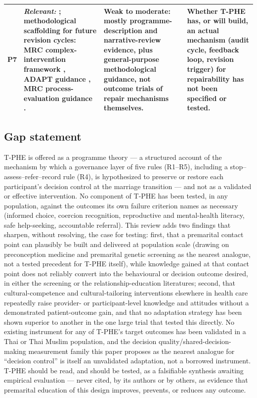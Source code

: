 \documentclass[11pt]{article}
\newcommand{\tphe}{T\mbox{-}PHE}
\begin{document}
\begin{table}[H]
\begin{tabularx}{\textwidth}{@{}p{0.9cm}YYY@{}}
\addlinespace
P7 & \emph{Relevant:} \cite{ref113,ref114,ref31,ref115,ref116}; methodological scaffolding for future revision cycles: MRC complex-intervention framework \cite{ref52}, ADAPT guidance \cite{ref53}, MRC process-evaluation guidance \cite{ref54}. & Weak to moderate: mostly programme-description and narrative-review evidence, plus general-purpose methodological guidance, not outcome trials of repair mechanisms themselves. & Whether \tphe{} has, or will build, an actual mechanism (audit cycle, feedback loop, revision trigger) for repairability has not been specified or tested.\\
\bottomrule
\end{tabularx}
\end{table}

\subsection{Gap statement}
\tphe{} is offered as a programme theory --- a structured account of the mechanism by which a governance layer of five rules (R1--R5), including a stop--assess--refer--record rule (R4), is hypothesized to preserve or restore each participant's decision control at the marriage transition --- and not as a validated or effective intervention. No component of \tphe{} has been tested, in any population, against the outcomes its own failure criterion names as necessary (informed choice, coercion recognition, reproductive and mental-health literacy, safe help-seeking, accountable referral). This review adds two findings that sharpen, without resolving, the case for testing: first, that a premarital contact point can plausibly be built and delivered at population scale (drawing on preconception medicine and premarital genetic screening as the nearest analogue, not a tested precedent for \tphe{} itself), while knowledge gained at that contact point does not reliably convert into the behavioural or decision outcome desired, in either the screening or the relationship-education literatures; second, that cultural-competence and cultural-tailoring interventions elsewhere in health care repeatedly raise provider- or participant-level knowledge and attitudes without a demonstrated patient-outcome gain, and that no adaptation strategy has been shown superior to another in the one large trial that tested this directly. No existing instrument for any of \tphe{}'s target outcomes has been validated in a Thai or Thai Muslim population, and the decision quality/shared-decision-making measurement family this paper proposes as the nearest analogue for ``decision control'' is itself an unvalidated adaptation, not a borrowed instrument. \tphe{} should be read, and should be tested, as a falsifiable synthesis awaiting empirical evaluation --- never cited, by its authors or by others, as evidence that premarital education of this design improves, prevents, or reduces any outcome.
\end{document}
